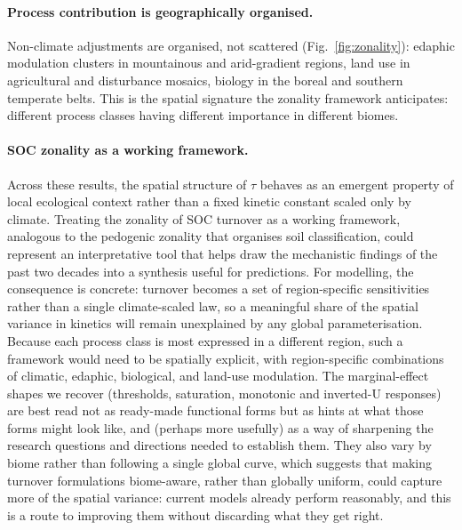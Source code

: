 \documentclass[12pt, a4paper]{article}
\begin{document}
\paragraph{Process contribution is geographically organised.}
Non-climate adjustments are organised, not scattered (Fig.~\ref{fig:zonality}):
edaphic modulation clusters in mountainous and arid-gradient regions, land use in
agricultural and disturbance mosaics, biology in the boreal and southern temperate
belts. This is the spatial signature the zonality framework anticipates: different
process classes having different importance in different biomes.

\paragraph{SOC zonality as a working framework.}
Across these results, the spatial structure of $\tau$ behaves as an emergent property of
local ecological context rather than a fixed kinetic constant scaled only by climate. Treating
the zonality of SOC turnover as a working framework, analogous to the pedogenic
zonality that organises soil classification, could represent an interpretative tool that helps draw the mechanistic findings of the past two decades into a synthesis useful for predictions. For modelling, the consequence is concrete: turnover becomes a set of region-specific sensitivities rather than a single climate-scaled law, so a meaningful share of the spatial variance in kinetics will remain unexplained by any global parameterisation. Because each process class is most expressed in a different region, such a framework would need to be spatially explicit, with region-specific combinations of climatic, edaphic, biological, and land-use modulation. The marginal-effect shapes we recover (thresholds, saturation, monotonic and
inverted-U responses) are best read not as ready-made functional forms but as hints
at what those forms might look like, and (perhaps more usefully) as a way of
sharpening the research questions and directions needed to establish them. They also
vary by biome rather than following a single global curve, which suggests that making
turnover formulations biome-aware, rather than globally uniform, could capture more
of the spatial variance: current models already perform reasonably, and this is a
route to improving them without discarding what they get right.
\end{document}
